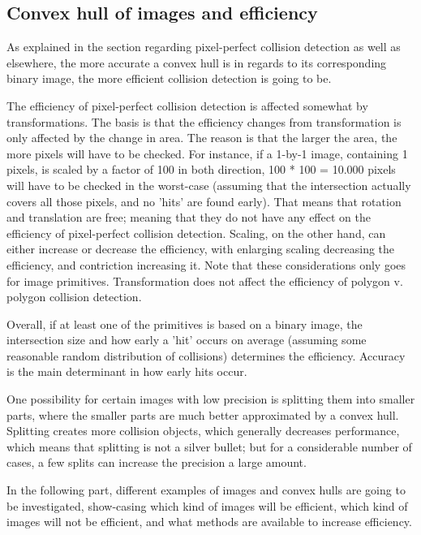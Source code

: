 
\subsection{Convex hull of images and efficiency}


As explained in the section regarding pixel-perfect
collision detection as well as elsewhere,
the more accurate a convex hull is in regards to its
corresponding binary image, the more efficient
collision detection is going to be.

The efficiency of pixel-perfect collision detection
is affected somewhat by transformations.
The basis is that the efficiency changes from transformation is only
affected by the change in area.
The reason is that the larger the area, the more pixels
will have to be checked.
For instance, if a 1-by-1 image, containing 1 pixels,
is scaled by a factor of 100 in both direction,
100 * 100 = 10.000 pixels will have to be checked
in the worst-case
(assuming that the intersection actually covers all
those pixels, and no 'hits' are found early).
That means that rotation and translation are free;
meaning that they do not have any effect
on the efficiency of pixel-perfect collision detection.
Scaling, on the other hand, can either increase
or decrease the efficiency, with enlarging scaling
decreasing the efficiency, and contriction
increasing it.
Note that these considerations only goes for
image primitives. Transformation does not
affect the efficiency of polygon v. polygon
collision detection.

Overall, if at least one of the primitives is
based on a binary image, the intersection
size and how early a 'hit' occurs on average
(assuming some reasonable random distribution of collisions)
determines the efficiency. Accuracy is the main determinant
in how early hits occur.

One possibility for certain images with low precision is
splitting them into smaller parts, where the smaller parts
are much better approximated by a convex hull.
Splitting creates more collision objects, which generally
decreases performance, which means that splitting is not
a silver bullet; but for a considerable number of cases,
a few splits can increase the precision a large amount.

In the following part, different examples of
images and convex hulls are going to be investigated, show-casing
which kind of images will be efficient,
which kind of images will not be efficient,
and what methods are available to increase
efficiency.

